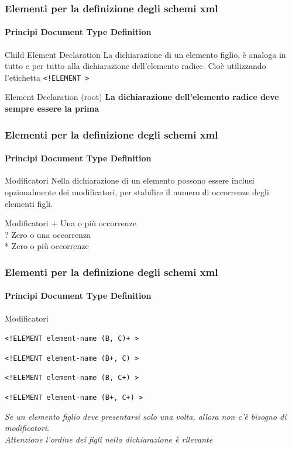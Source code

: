 \begin{frame}
    \frametitle{Elementi per la definizione degli schemi xml}
    \framesubtitle{Principi Document Type Definition}
    \addtocounter{nframe}{1}

    \begin{block}{Child Element Declaration}
        La dichiarazione di un elemento figlio, è analoga in tutto e per tutto alla dichiarazione dell'elemento radice. Cioè utilizzando l'etichetta \texttt{<!ELEMENT >}
    \end{block}

    \begin{block}{Element Declaration (root)}
     \textbf{La dichiarazione dell'elemento radice deve sempre essere la prima}
    \end{block}
\end{frame}

\begin{frame}
    \frametitle{Elementi per la definizione degli schemi xml}
    \framesubtitle{Principi Document Type Definition}
    \addtocounter{nframe}{1}

    \begin{block}{Modificatori}
        Nella dichiarazione di un elemento possono essere inclusi opzionalmente dei modificatori, per stabilire il numero di occorrenze degli elementi figli.
    \end{block}

    \begin{block}{Modificatori}
     + Una o più occorrenze\\ 
     ? Zero o una occorrenza\\
     * Zero o più occorrenze
    \end{block}
\end{frame}

\begin{frame}
    \frametitle{Elementi per la definizione degli schemi xml}
    \framesubtitle{Principi Document Type Definition}
    \addtocounter{nframe}{1}

    \begin{block}{Modificatori}
        \begin{center} \texttt{<!ELEMENT element-name (B, C)+ >} \end{center}
        \begin{center} \texttt{<!ELEMENT element-name (B+, C) >} \end{center}
        \begin{center} \texttt{<!ELEMENT element-name (B, C+) >} \end{center}
        \begin{center} \texttt{<!ELEMENT element-name (B+, C+) >} \end{center}
    \end{block}

     \textit{Se un elemento figlio deve presentarsi solo una volta, allora non c'è bisogno di modificatori}.
     \\\textit{Attenzione l'ordine dei figli nella dichiarazione è rilevante}
    
\end{frame}

